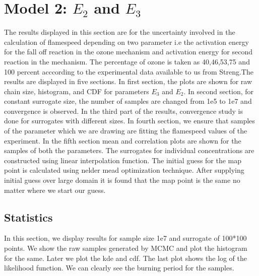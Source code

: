 \section{Model 2: $E_2$ and $E_3$}

The results displayed in this section are for the uncertainty involved in the calculation of flamespeed depending  on two parameter i.e the activation energy for the fall off reaction in the ozone mechanism and activation energy for second reaction in the mechanism. The percentage of ozone is taken as 40,46,53,75 and 100  percent acccording to the experimental data available to us from Streng\cite{Streng}.The results are displayed in five sections. In first section, the plots are shown for raw chain size, histogram, and CDF for parameters $E_3$ and $E_2$. In second section, for constant surrogate size, the number of samples are changed from 1e5 to 1e7 and convergence is observed. In the third part of the results, convergence study is done for surrogates with different sizes. In fourth section, we ensure that samples of the parameter which we are drawing are fitting the flamespeed values of the experiment. In the fifth section mean and correlation plots are shown for the samples of both the parameters. The surrogates for individual concentrations are constructed using linear interpolation function. The initial guess for the map point is calculated using nelder mead optimization technique. After supplying initial guess over large domain it is found that the map point is the same no matter where we start our guess. 


\subsection{ Statistics }

\noindent In this section, we display results for sample size 1e7 and surrogate of 100*100 points. We show the raw samples generated by MCMC and plot the histogram for the same. Later we plot the kde and cdf. The last plot shows the log of the likelihood function. We can clearly see the burning period for the samples. 

